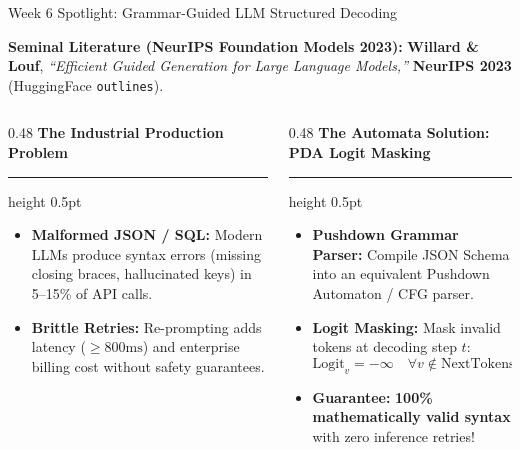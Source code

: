 \documentclass[aspectratio=169, 10pt]{beamer}
\newcommand{\colheader}[1]{%
  {\noindent\footnotesize\bfseries\color{gimpanavy}#1}%
  \vspace{0.03cm}%
  {\color{gimpanavy!30}\hrule height 0.5pt}%
  \vspace{0.08cm}%
}
\begin{document}
\begin{frame}{Week 6 Spotlight: Grammar-Guided LLM Structured Decoding}
  \begin{tcolorbox}[spotlightcard, top=2pt, bottom=2pt, before=\vspace{0pt}, after=\vspace{2pt}]
    \footnotesize
    \textbf{Seminal Literature (NeurIPS Foundation Models 2023):} 
    \textbf{Willard \& Louf}, \textit{``Efficient Guided Generation for Large Language Models,''} \textbf{NeurIPS 2023} (HuggingFace \texttt{outlines}).
  \end{tcolorbox}

  \vspace{0.04cm}
  \begin{columns}[T]
    \begin{column}{0.48\textwidth}
      \colheader{The Industrial Production Problem}
      \begin{tcolorbox}[alertcard, top=3pt, bottom=3pt]
        \begin{itemize}\setlength{\itemsep}{2.5pt}\footnotesize
          \item \textbf{Malformed JSON / SQL:} Modern LLMs produce syntax errors (missing closing braces, hallucinated keys) in 5--15\% of API calls.
          \item \textbf{Brittle Retries:} Re-prompting adds latency ($\ge 800\text{ms}$) and enterprise billing cost without safety guarantees.
        \end{itemize}
      \end{tcolorbox}
    \end{column}

    \hfill

    \begin{column}{0.48\textwidth}
      \colheader{The Automata Solution: PDA Logit Masking}
      \begin{tcolorbox}[examplecard, top=3pt, bottom=3pt]
        \begin{itemize}\setlength{\itemsep}{2.5pt}\footnotesize
          \item \textbf{Pushdown Grammar Parser:} Compile JSON Schema into an equivalent Pushdown Automaton / CFG parser.
          \item \textbf{Logit Masking:} Mask invalid tokens at decoding step $t$:
            $$\text{Logit}_v = -\infty \quad \forall v \notin \text{NextTokens}(S_t)$$
          \item \textbf{Guarantee:} \textbf{100\% mathematically valid syntax} with zero inference retries!
        \end{itemize}
      \end{tcolorbox}
    \end{column}
  \end{columns}
\end{frame}
\end{document}
